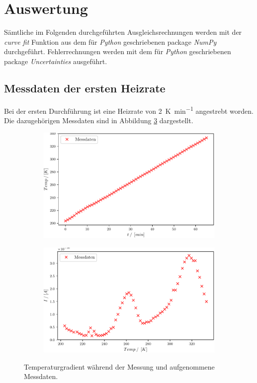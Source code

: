 \section{Auswertung}
\label{sec:Auswertung}
Sämtliche im Folgenden durchgeführten Ausgleichsrechnungen werden mit der \emph{curve fit} Funktion aus dem für \emph{Python} geschriebenen package \emph{NumPy}\cite{scipy} durchgeführt. Fehlerrechnungen werden mit dem für \emph{Python} geschriebenen package \emph{Uncertainties}\cite{uncertainties} ausgeführt.

\subsection{Messdaten der ersten Heizrate}
\label{sec:hohe_heizrate}
Bei der ersten Durchführung ist eine Heizrate von \SI{2}{\kelvin\per\minute} angestrebt worden. Die dazugehörigen Messdaten sind in Abbildung \ref{fig:Auswertung_1_2} dargestellt.


\begin{figure}
\centering
\begin{subfigure}{.5\textwidth}
	\centering
	\includegraphics[width=1\textwidth]{build/1_Temp_Time.pdf}
	\caption{}
	\label{fig:Auswertung_1}
\end{subfigure}%
\begin{subfigure}{.5\textwidth}
	\centering
	\includegraphics[width=1\textwidth]{build/1_Temp_current.pdf}
	\caption{}
	\label{fig:Auswertung_2}
\end{subfigure}
\caption{Temperaturgradient während der Messung und aufgenommene Messdaten.}
\label{fig:Auswertung_1_2}
\end{figure}


